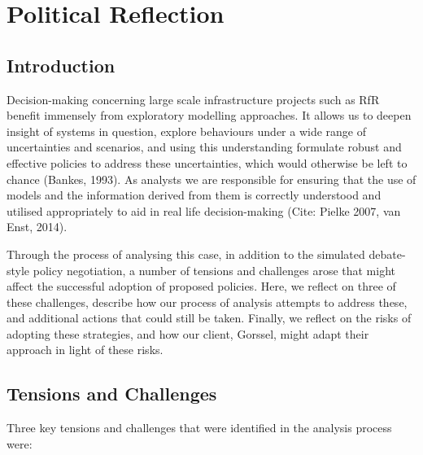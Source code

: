 \section{Political Reflection}
\label{s:poli_reflect}
\subsection{Introduction}

Decision-making concerning large scale infrastructure projects such as RfR benefit immensely from exploratory modelling approaches. It allows us to deepen insight of systems in question, explore behaviours under a wide range of uncertainties and scenarios, and using this understanding formulate robust and effective policies to address these uncertainties, which would otherwise be left to chance (Bankes, 1993). As analysts we are responsible for ensuring that the use of models and the information derived from them is correctly understood and utilised appropriately to aid in real life decision-making (Cite: Pielke 2007, van Enst, 2014). 

Through the process of analysing this case, in addition to the simulated debate-style policy negotiation, a number of tensions and challenges arose that might affect the successful adoption of proposed policies. Here, we reflect on three of these challenges, describe how our process of analysis attempts to address these, and additional actions that could still be taken. Finally, we reflect on the risks of adopting these strategies, and how our client, Gorssel, might adapt their approach in light of these risks.

\subsection{Tensions and Challenges} 

Three key tensions and challenges that were identified in the analysis process were:

